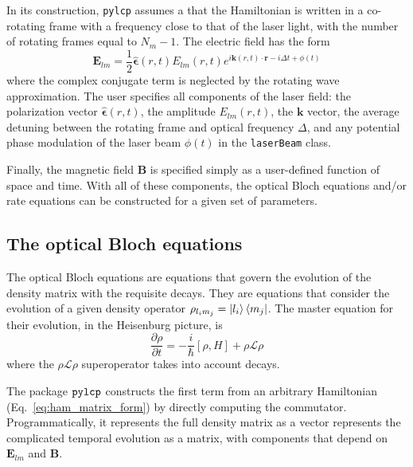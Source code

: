 \documentclass[final,5p,times,twocolumn]{elsarticle}
\begin{document}
In its construction, {\tt pylcp} assumes a that the Hamiltonian is written in a co-rotating frame with a frequency close to that of the laser light, with the number of rotating frames equal to $N_m-1$.  The electric field has the form
\begin{equation}
	\mathbf{E}_{lm} = \frac{1}{2}\hat{\boldsymbol{\epsilon}}(r, t) E_{lm}(r, t)e^{i\mathbf{k}(r,t)\cdot\mathbf{r}-i \Delta t + \phi(t)}
\end{equation}
where the complex conjugate term is neglected by the rotating wave approximation.  The user specifies all components of the laser field: the polarization vector $\hat{\boldsymbol{\epsilon}}(r, t)$, the amplitude $E_{lm}(r, t)$, the $\mathbf{k}$ vector, the average detuning between the rotating frame and optical frequency $\Delta$,  and any potential phase modulation of the laser beam $\phi(t)$ in the {\tt laserBeam} class.

Finally, the magnetic field $\mathbf{B}$ is specified simply as a user-defined function  of space and time.  With all of these components, the optical Bloch equations and/or rate equations can be constructed for a given set of parameters.

\subsection{The optical Bloch equations}
The optical Bloch equations are equations that govern the evolution of the density matrix with the requisite decays.  They are equations that consider the evolution of a given density operator $\rho_{l_im_j} = \ket{l_i}\Bra{m_j}$.  The master equation for their evolution, in the Heisenburg picture, is
\begin{equation}
	\frac{\partial \rho}{\partial t} = -\frac{i}{\hbar}[\rho, H] + \rho\mathcal{L}\rho
\end{equation}
where the $\rho\mathcal{L}\rho$ superoperator takes into account decays.

The package ${\tt pylcp}$ constructs the first term from an arbitrary Hamiltonian (Eq.~\ref{eq:ham_matrix_form}) by directly computing the commutator.  Programmatically, it  represents the full density matrix as a vector represents the complicated temporal evolution as a matrix, with components that depend on $\mathbf{E}_{lm}$ and $\mathbf{B}$.
\end{document}
